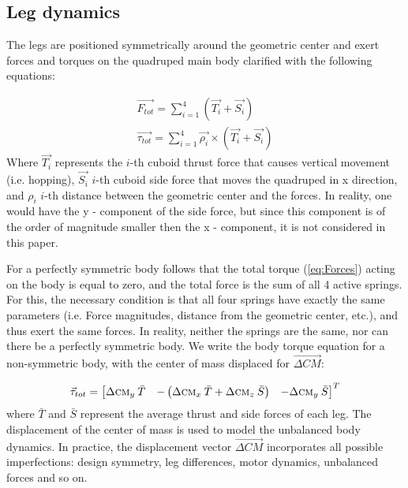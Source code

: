 \subsection{Leg dynamics}


The legs are positioned symmetrically around the geometric center and exert forces and torques on the quadruped main body clarified with the following equations:

\begin{gather}\label{eq:Forces}
\vec{F_{tot}}=\sum_{i=1}^{4}(\vec{T_{i}}+\vec{S_{i}})\\
\vec{\tau_{tot}}=\sum_{i=1}^{4}\vec{\rho _i}\times(\vec{T_{i}}+\vec{S_{i}})
\end{gather}  
Where $\vec{T_{i}}$ represents the $i$-th cuboid thrust force that causes vertical movement (i.e. hopping), $\vec{S_{i}}$ $i$-th cuboid side force that moves the quadruped in x direction, and $\rho _i$ $i$-th distance between the geometric center and the forces. In reality, one would have the y - component of the side force, but since this component is of the order of magnitude smaller then the x - component, it is not considered in this paper.

For a perfectly symmetric body follows that the total torque (\ref{eq:Forces}) acting on the body is equal to zero, and the total force is the sum of all 4 active springs. For this, the necessary condition is that all four springs have exactly the same parameters (i.e. Force magnitudes, distance from the geometric center, etc.), and thus exert the same forces. In reality, neither the springs are the same, nor can there be a perfectly symmetric body. We write the body torque equation for a non-symmetric body, with the center of mass displaced for $\vec{\Delta CM}$:

\begin{equation}\label{eq:Torques}
\vec{\tau}_{tot}=\begin{bmatrix}
\Delta \textsc{cm}_y \:\bar{T} & -\left ( \Delta \textsc{cm}_x \:\bar{T} +\Delta \textsc{cm}_z \:\bar{S}\right ) & -\Delta \textsc{cm}_y \:\bar{S}
\end{bmatrix}^T
\end{equation}
where $\bar{T}$ and $\bar{S}$ represent the average thrust and side forces of each leg. The displacement of the center of mass is used to model the unbalanced body dynamics. In practice, the displacement vector  $\vec{\Delta CM}$ incorporates all possible imperfections: design symmetry, leg differences, motor dynamics, unbalanced  forces and so on.

